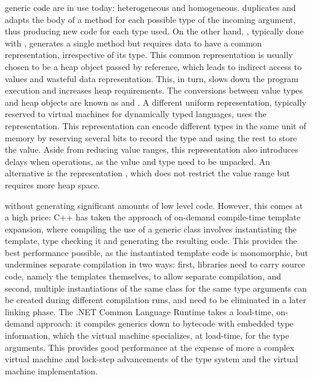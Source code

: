  generic code are in use today: heterogeneous and homogeneous.  duplicates and adapts the body of a method for each possible type of the incoming argument, thus producing new code for each type used. On the other hand, , typically done with , generates a single method but requires data to have a common representation, irrespective of its type. This common representation is usually chosen to be a heap object passed by reference, which leads to indirect access to values and wasteful data representation. This, in turn, slows down the program execution and increases heap requirements. The conversions between value types and heap objects are known as  and . A different uniform representation, typically reserved to virtual machines for dynamically typed languages, uses the  \cite{fixnums-lisp} representation. This representation can encode different types in the same unit of memory by reserving several bits to record the type and using the rest to store the value. Aside from reducing value ranges, this representation also introduces delays when  operations, as the value and type need to be unpacked. An alternative is the  representation \cite{tagged-unions-lua}, which does not restrict the value range but requires more heap space.

 without generating significant amounts of low level code. However, this comes at a high price: C++ has taken the approach of on-demand compile-time template expansion, where compiling the use of a generic class involves instantiating the template, type checking it and generating the resulting code. This provides the best performance possible, as the instantiated template code is monomorphic, but undermines separate compilation in two ways: first, libraries need to carry source code, namely the templates themselves, to allow separate compilation, and second, multiple instantiations of the same class for the same type arguments can be created during different compilation runs, and need to be eliminated in a later linking phase. The .NET Common Language Runtime takes a load-time, on-demand approach: it compiles generics down to bytecode with embedded type information, which the virtual machine specializes, at load-time, for the type arguments. This provides good performance at the expense of more a complex virtual machine and lock-step advancements of the type system and the virtual machine implementation.

